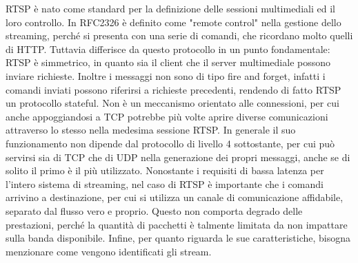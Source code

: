 RTSP è nato come standard per la definizione delle sessioni multimediali ed il loro controllo. %
In RFC2326 è definito come "remote control" nella gestione dello streaming, perché si presenta con una serie di comandi, che ricordano molto quelli di HTTP. Tuttavia differisce da questo protocollo in un punto fondamentale: RTSP è simmetrico, in quanto sia il client che il server multimediale possono inviare richieste. Inoltre i messaggi non sono di tipo fire and forget, infatti i comandi inviati possono riferirsi a richieste precedenti, rendendo di fatto RTSP un protocollo stateful\cite{a11rfc2326}. %
Non è un meccanismo orientato alle connessioni, per cui anche appoggiandosi a TCP potrebbe più volte aprire diverse comunicazioni attraverso lo stesso nella medesima sessione RTSP. In generale il suo funzionamento non dipende dal protocollo di livello 4 sottostante, per cui può servirsi sia di TCP che di UDP nella generazione dei propri messaggi, anche se di solito il primo è il più utilizzato. Nonostante i requisiti di bassa latenza per l'intero sistema di streaming, nel caso di RTSP è importante che i comandi arrivino a destinazione, per cui si utilizza un canale di comunicazione affidabile, separato dal flusso vero e proprio. Questo non comporta degrado delle prestazioni, perché la quantità di pacchetti è talmente limitata da non impattare sulla banda disponibile. Infine, per quanto riguarda le sue caratteristiche, bisogna menzionare come vengono identificati gli stream. 

